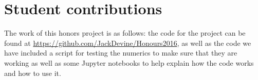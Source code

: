 \section{Student contributions}
The work of this honors project is as follows:
the code for the project can be found at \href{url}{https://github.com/JackDevine/Honours2016}, as well as the code we have included a script for testing the numerics to make sure that they are working as well as some Jupyter notebooks to help explain how the code works and how to use it.
